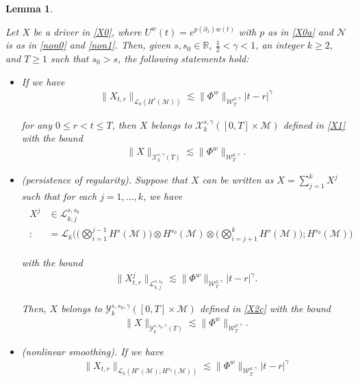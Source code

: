 \documentclass[letterpaper, 11pt,  reqno]{amsart}
\newtheorem{lemma}[theorem]{Lemma}
\newcommand{\1}{\hspace{0.5mm}\text{I}\hspace{0.5mm}}
\newcommand{\noi}{\noindent}
\newcommand{\R}{\mathbb{R}}
\newcommand{\g}{\gamma}
\newcommand{\dx}{\partial_x}
\newcommand{\les}{\lesssim}
\newcommand{\M}{\mathcal{M}}
\newcommand{\NN}{\mathcal{N}}
\newcommand{\cL}{\mathcal{L}}
\newcommand{\cX}{\mathcal{X}}
\newcommand{\cY}{\mathcal{Y}}
\newcommand{\W}{\mathcal{W}}
\numberwithin{equation}{section}
\numberwithin{theorem}{section}
\begin{document}
\begin{lemma}\label{LEM:OBS1}

Let $X$ be a driver in \eqref{X0}, 
where $U^w(t) = e^{p(\dx) w(t)}$ with $p$ as in \eqref{X0a}
and $\NN$ is as in \eqref{non0} and \eqref{non1}.
Then, given  $s, s_0 \in \R$, $\frac 12 < \g < 1$, an integer $k \ge 2$,  and $T \ge 1$
such that $s_0 > s$, 
the following statements hold\textup{:}



\smallskip
\begin{itemize}
\item[(i)] 
If we have 
\begin{align*}
\|X_{t,r}\|_{\cL_k(H^s(\M))}
\les 
\|\Phi^w\|_{\W^{\rho,\g}_T}
|t-r|^{\g}
\end{align*}

\noi
for any $0 \le r < t \le T$, 
then
 $X$ belongs to $\cX^{s, \g}_k([0, T]\times \M)$
 defined in 
 \eqref{X1}
with the bound 
\begin{align*}
\|X\|_{\cX^{s, \g}_k(T)} \les \|\Phi^w\|_{\W^{\rho,\g}_T}.
\end{align*}




\smallskip
\item[(ii)] \textup{(persistence of regularity).}
Suppose that $X$ can be written as  $X = \sum_{j = 1}^k X^j$
such that for each $j = 1, \dots, k$, we have 
\begin{align}
\begin{split}
X^j &\in \cL_{k, j}^{s, s_0}\\ :\!&=
\cL_k\Big(\big(\bigotimes_{i  = 1}^{j-1}H^{s}(\M)\big) \otimes
H^{s_0}(\M) 
\otimes \big(\bigotimes_{i  = j+1}^{k}H^{s}(\M)\big); H^{s_0}(\M)\Big)
\end{split}
\label{X5}
\end{align}

\noi
with the bound
\begin{align*}
\|X^j_{t,r}\|_{\cL_{k, j}^{s, s_0}}
\les 
\|\Phi^w\|_{\W^{\rho,\g}_T}
|t-r|^{\g}.
\end{align*}

\noi
Then, 
 $X$ belongs to $ \cY^{s, s_0, \g}_k([0, T]\times \M)$
 defined  in \eqref{X2c}
 with the bound 
\begin{align*}
\|X\|_{\cY^{s,s_0,  \g}_k(T)} \les \|\Phi^w\|_{\W^{\rho,\g}_T}.
\end{align*}



\smallskip
\item[(iii)] \textup{(nonlinear smoothing).}
If we have 
\begin{align*}
\|X_{t,r}\|_{\cL_k(H^s(\M); H^{s_0}(\M))}
\les 
\|\Phi^w\|_{\W^{\rho,\g}_T}
|t-r|^{\g}
\end{align*}


\end{itemize}
\end{lemma}
\end{document}
